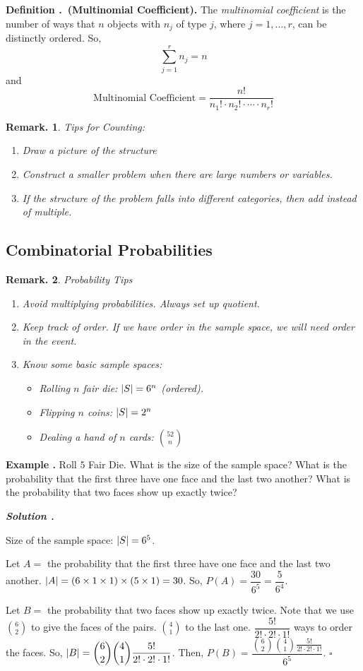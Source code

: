 \documentclass[12pt, a4paper]{article}
\newcounter{index}[subsection]
\newenvironment*{df}[1]{\par\noindent\textbf{Definition \thesubsection.\stepcounter{index}\theindex\ (#1).}}{\par}
\newenvironment*{eg}{\begin{framed}\par\noindent\textbf{Example \thesubsection.\stepcounter{index}\theindex}}{\par\end{framed}}
\newcounter{nprf}[subsection]
\newenvironment*{sol}{\par\indent\textbf{\textit{Solution \stepcounter{nprf}\thenprf.}}\par}{\hfill{$\square$}\par}
\newtheorem*{rmk}{Remark.}
\def\dsst{\displaystyle}
\begin{document}
\begin{df}{Multinomial Coefficient}
	The \textit{multinomial coefficient} is the number of ways that $n$ objects with $n_j$ of type $j$, where $j=1,\dots,r$, can be distinctly ordered. So, \[\sum_{j=1}^rn_j=n\] and \[\text{Multinomial Coefficient}=\dfrac{n!}{n_1!\cdot n_2!\cdot\cdots\cdot n_r!}\]
\end{df}
\begin{rmk}
	Tips for Counting:
	\begin{enumerate}
		\item Draw a picture of the structure
		\item Construct a smaller problem when there are large numbers or variables.
		\item If the structure of the problem falls into different categories, then add instead of multiple. 
	\end{enumerate}	
\end{rmk}

\subsection{Combinatorial Probabilities}
\begin{rmk}
	Probability Tips
	\begin{enumerate}
		\item Avoid multiplying probabilities. Always set up quotient.
		\item Keep track of order. If we have order in the sample space, we will need order in the event.
		\item Know some basic sample spaces:
		\begin{itemize}
			\item Rolling $n$ fair die: $\qty|S|=6^n$ (ordered).
			\item Flipping $n$ coins: $\qty|S|=2^n$
			\item Dealing a hand of $n$ cards: $\dsst\binom{52}{n}$
		\end{itemize}
	\end{enumerate}	
\end{rmk}
\begin{eg}{}
	Roll $5$ Fair Die. What is the size of the sample space? What is the probability that the first three have one face and the last two another? What is the probability that two faces show up exactly twice? 
	\begin{sol}
		\par Size of the sample space: $\qty|S|=6^5$.
		\par Let $A=$ the probability that the first three have one face and the last two another. $\qty|A|=(6\times1\times1)\times(5\times1)=30$. So, $P(A)=\dfrac{30}{6^5}=\dfrac{5}{6^4}$.
		\par Let $B=$ the probability that two faces show up exactly twice. Note that we use $\dsst\binom{6}{2}$ to give the faces of the pairs. $\dsst\binom{4}{1}$ to the last one. $\dfrac{5!}{2!\cdot2!\cdot1!}$ ways to order the faces. So, $\qty|B|=\dsst\binom{6}{2}\binom{4}{1}\dfrac{5!}{2!\cdot2!\cdot1!}$. Then, $P(B)=\dfrac{\binom{6}{2}\binom{4}{1}\frac{5!}{2!\cdot2!\cdot1!}}{6^5}$.
	\end{sol}
\end{eg}
\end{document}
